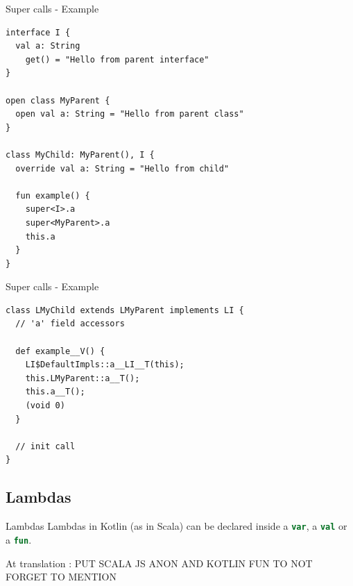 \documentclass[10pt]{beamer}
\newcommand{\inlinecode}[2]{\colorbox{minted-bg}{\lstinline[language=#1]$#2$}}
\newcommand{\ktinline}[1]{\inlinecode{kotlin}{#1}}
\begin{document}
\begin{frame}[fragile]{Super calls - Example}
 \begin{verbatim}
interface I {
  val a: String
    get() = "Hello from parent interface"
}

open class MyParent {
  open val a: String = "Hello from parent class"
}

class MyChild: MyParent(), I {
  override val a: String = "Hello from child"

  fun example() {
    super<I>.a
    super<MyParent>.a
    this.a
  }
}
 \end{verbatim}

\end{frame}

\begin{frame}[fragile]{Super calls - Example}

 \begin{verbatim}
class LMyChild extends LMyParent implements LI {
  // 'a' field accessors
  
  def example__V() {
    LI$DefaultImpls::a__LI__T(this);
    this.LMyParent::a__T();
    this.a__T();
    (void 0)
  }
  
  // init call
}
 \end{verbatim}

\end{frame}


\subsection{Lambdas}

\begin{frame}[fragile]{Lambdas}
 Lambdas in Kotlin (as in Scala) can be declared inside a \ktinline{var}, a \ktinline{val} or a \ktinline{fun}.
 
 At translation : PUT SCALA JS ANON AND KOTLIN FUN TO NOT FORGET TO MENTION
\end{frame}
\end{document}

